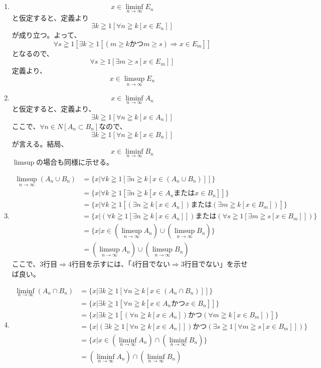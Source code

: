 \documentclass{jsarticle}
\begin{document}
\subsection{}
\begin{enumerate}
\item
\[x\in\liminf_{n\to\infty}E_{n}\]
と仮定すると、定義より
\[\exists k \geqq 1 [\forall n\geqq k[x\in E_{n}]]\]
が成り立つ。よって、
\[\forall s \geqq 1[\exists k\geq 1[(m \geq k かつ m\geq s)\Longrightarrow x\in E_{m}]]\]
となるので、
\[\forall s \geq 1[\exists m\geq s[x\in E_{m}]]\]
定義より、\[x\in\limsup_{n\to\infty}E_{n}\]

\item
\[x\in\liminf_{n\to\infty}A_{n}\]
と仮定すると、定義より、
\[\exists k\geqq 1[\forall n\geqq k[x\in A_{n}]]\]
ここで、$\forall n\in N[A_n \subset B_n]$なので、
\[\exists k\geqq 1[\forall n\geqq k[x\in B_{n}]]\]
が言える。結局、
\[x\in\liminf_{n\to\infty}B_{n}\]
$\limsup$の場合も同様に示せる。
\item
\begin{align*}
\limsup_{n\to\infty}(A_{n}\cup B_{n})&=\{x|\forall k\geqq 1[\exists n\geqq k[x\in(A_{n}\cup B_{n})]]\}\\
&=\{x|\forall k\geqq 1[\exists n\geqq k[x\in A_{n} または x\in B_{n}]]\}\\
&=\{x|\forall k\geqq 1[(\exists n\geqq k[x\in A_{n}]) または (\exists m \geqq k[x\in B_{m}])]\}\\
&=\{x|(\forall k\geqq 1[\exists n\geqq k[x\in A_{n}]]) または (\forall s\geqq 1[\exists m \geqq s[x\in B_{m}]])\}\\
&=\{x|x\in(\limsup_{n\to\infty}A_{n})\cup (\limsup_{n\to\infty}B_{n})\}\\
&=(\limsup_{n\to\infty}A_{n})\cup (\limsup_{n\to\infty}B_{n})
\end{align*}
ここで、$3行目\Longrightarrow4行目$を示すには、「4行目でない$\Longrightarrow$3行目でない」を示せば良い。
\item
\begin{align*}
\liminf_{n\to\infty}(A_{n}\cap B_{n})&=\{x|\exists k\geqq 1[\forall n\geqq k[x\in(A_{n}\cap B_{n})]]\}\\
&=\{x|\exists k\geqq 1[\forall n\geqq k[x\in A_{n} かつ x\in B_{n}]]\}\\
&=\{x|\exists k\geqq 1[(\forall n\geqq k[x\in A_{n}]) かつ (\forall m \geqq k[x\in B_{m}])]\}\\
&=\{x|(\exists k\geqq 1[\forall n\geqq k[x\in A_{n}]]) かつ (\exists s\geqq 1[\forall m \geqq s[x\in B_{m}]])\}\\
&=\{x|x\in(\liminf_{n\to\infty}A_{n})\cap (\liminf_{n\to\infty}B_{n})\}\\
&=(\liminf_{n\to\infty}A_{n})\cap (\liminf_{n\to\infty}B_{n})
\end{align*}
\end{enumerate}
\end{document}
